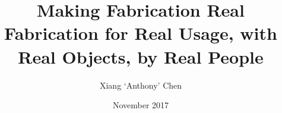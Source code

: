\documentclass[12pt]{cmuthesis}
\begin{document}
\frontmatter

\pagestyle{empty}

\title{ %
{\bf Making Fabrication Real}\\
{Fabrication for Real Usage, with Real Objects, by Real People}}
\author{Xiang `Anthony' Chen}
\date{November 2017}
\trnumber{}


\support{}
\disclaimer{}



\maketitle

\begin{dedication}
\end{dedication}

\pagestyle{plain} %

\end{document}
